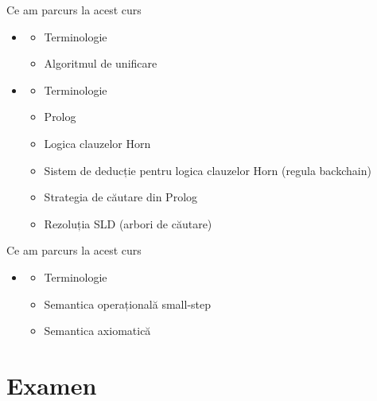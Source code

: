 \documentclass[xcolor=pdftex,romanian,colorlinks]{beamer}
\begin{document}
\begin{frame}{Ce am parcurs la acest curs}
\begin{itemize}
	\item {}
	\begin{itemize}
			\item Terminologie
			\item Algoritmul de unificare	
	\end{itemize}
	
	\vspace{.6cm}
	\item {}
	\begin{itemize}
			\item Terminologie
			\item Prolog
			\item Logica clauzelor Horn
			\item Sistem de deducție pentru logica clauzelor Horn (regula backchain)
			\item Strategia de căutare din Prolog
			\item Rezoluția SLD (arbori de căutare)
	\end{itemize}
\end{itemize}
\end{frame}

\begin{frame}{Ce am parcurs la acest curs}
\begin{itemize}
	\item {}
	\begin{itemize}
			\item Terminologie
			\item Semantica operațională small-step
			\item Semantica axiomatică
	\end{itemize}
	
\end{itemize}
\end{frame}

\section{\color{section-color} Examen}
\end{document}
